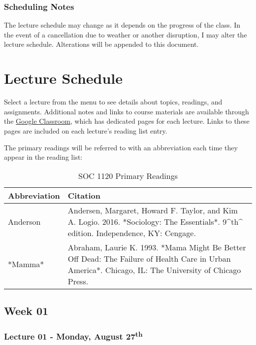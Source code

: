 \documentclass[]{book}
\theoremstyle{definition}
\theoremstyle{definition}
\theoremstyle{definition}
\theoremstyle{remark}
\begin{document}
\hypertarget{scheduling-notes}{%
\subsection{Scheduling Notes}\label{scheduling-notes}}

The lecture schedule may change as it depends on the progress of the
class. In the event of a cancellation due to weather or another
disruption, I may alter the lecture schedule. Alterations will be
appended to this document.

\hypertarget{lecture-schedule}{%
\chapter{Lecture Schedule}\label{lecture-schedule}}

Select a lecture from the menu to see details about topics, readings,
and assignments. Additional notes and links to course materials are
available through the \href{https://classroom.google.com}{Google
Classroom}, which has dedicated pages for each lecture. Links to these
pages are included on each lecture's reading list entry.

The primary readings will be referred to with an abbreviation each time
they appear in the reading list:

\begin{table}

\caption{\label{tab:unnamed-chunk-1}SOC 1120 Primary Readings}
\centering
\begin{tabular}[t]{ll}
\toprule
Abbreviation & Citation\\
\midrule
Anderson & Andersen, Margaret, Howard F. Taylor, and Kim A. Logio. 2016. *Sociology: The Essentials*. 9\textasciicircum{}th\textasciicircum{} edition. Independence, KY: Cengage.\\
*Mamma* & Abraham, Laurie K. 1993. *Mama Might Be Better Off Dead: The Failure of Health Care in Urban America*. Chicago, IL: The University of Chicago Press.\\
\bottomrule
\end{tabular}
\end{table}

\hypertarget{week-01}{%
\section*{Week 01}\label{week-01}}

\hypertarget{lecture-01---monday-august-27th}{%
\subsection*{\texorpdfstring{Lecture 01 - Monday, August
27\textsuperscript{th}}{Lecture 01 - Monday, August 27th}}\label{lecture-01---monday-august-27th}}
\end{document}
